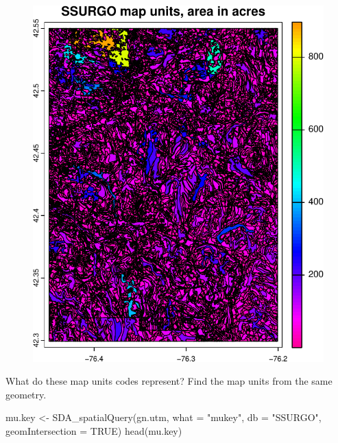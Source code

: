 \documentclass[
  letterpaper,
  DIV=11,
  numbers=noendperiod]{scrartcl}
\newenvironment{Shaded}{\begin{snugshade}}{\end{snugshade}}
\newcommand{\AttributeTok}[1]{\textcolor[rgb]{0.40,0.45,0.13}{#1}}
\newcommand{\ConstantTok}[1]{\textcolor[rgb]{0.56,0.35,0.01}{#1}}
\newcommand{\FunctionTok}[1]{\textcolor[rgb]{0.28,0.35,0.67}{#1}}
\newcommand{\NormalTok}[1]{\textcolor[rgb]{0.00,0.23,0.31}{#1}}
\newcommand{\OtherTok}[1]{\textcolor[rgb]{0.00,0.23,0.31}{#1}}
\newcommand{\StringTok}[1]{\textcolor[rgb]{0.13,0.47,0.30}{#1}}
\begin{document}
\begin{figure}[H]

{\centering \includegraphics{PatternAnalysisWorkshopTutorial_files/figure-pdf/download-ssurgo-1.pdf}

}

\end{figure}

What do these map units codes represent? Find the map units from the
same geometry.

\begin{Shaded}
\begin{Highlighting}[]
\NormalTok{mu.key }\OtherTok{\textless{}{-}} \FunctionTok{SDA\_spatialQuery}\NormalTok{(gn.utm, }
                           \AttributeTok{what =} \StringTok{"mukey"}\NormalTok{, }
                           \AttributeTok{db =} \StringTok{"SSURGO"}\NormalTok{, }
                           \AttributeTok{geomIntersection =} \ConstantTok{TRUE}\NormalTok{)}
\FunctionTok{head}\NormalTok{(mu.key)}
\end{Highlighting}
\end{Shaded}
\end{document}
